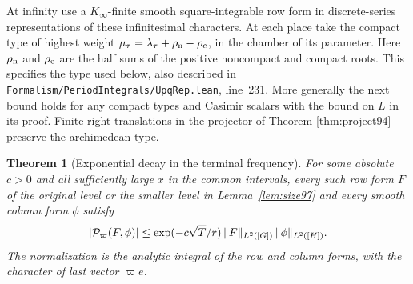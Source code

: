 \documentclass[a4paper,11pt]{article}
\newtheorem{theorem}[proposition]{Theorem}
\theoremstyle{definition}
\theoremstyle{remark}
\newcommand{\srcloc}[2]{{\small\nolinkurl{#1.lean}}, line~#2}
\numberwithin{equation}{section}
\begin{document}
At infinity use a \(K_\infty\)-finite smooth square-integrable row
form in discrete-series representations of these infinitesimal
characters. At each place take the compact type of highest weight
\(\mu_\tau=\lambda_\tau+\rho_{\rm n}-\rho_{\rm c}\), in the chamber
of its parameter. Here \(\rho_{\rm n}\) and \(\rho_{\rm c}\)
are the half sums of the positive noncompact and compact roots.
This specifies the type used below, also described in
\srcloc{Formalism/PeriodIntegrals/UpqRep}{231}. More generally the
next bound holds for any compact types and Casimir scalars with the
bound on \(L\) in its proof. Finite right translations in the
projector of Theorem \ref{thm:project94} preserve the archimedean type.

\begin{theorem}[Exponential decay in the terminal frequency]\label{thm:raw97}
For some absolute \(c>0\) and all sufficiently large \(x\)
in the common intervals, every such row form \(F\) of the
original level or the smaller level in Lemma~\ref{lem:size97}
and every smooth column form \(\phi\) satisfy
\begin{equation}
 |{\cal P}_{\varpi}(F,\phi)|\le
       \exp(-c\sqrt T/r)\,\|F\|_{L^2([G])}\,\|\phi\|_{L^2([H])}.
 \label{eq:raw97}
\end{equation}
The normalization is the analytic integral of the row and column
forms, with the character of last vector \(\varpi e\).
\end{theorem}
\end{document}

